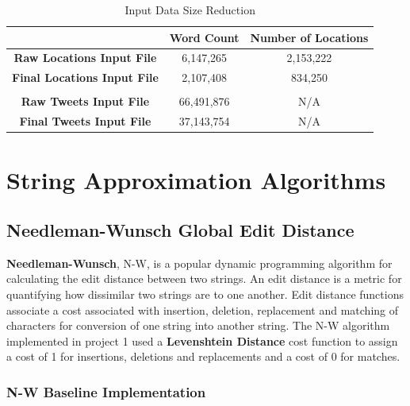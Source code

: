 \documentclass[11pt,a4paper]{article}
\begin{document}
\begin{table} [th]
\caption{Input Data Size Reduction}
\begin{center}
	\begin{tabular}{| c | c | c |}
	\hline
	 &  \textbf{Word Count} & \textbf{Number of Locations}\\
	\hline
	\textbf{Raw Locations Input File} & 6,147,265 & 2,153,222\\
	\hline
	\textbf{Final Locations Input File} & 2,107,408 & 834,250\\
	\hline
	 &  & \\
	\hline
	\textbf{Raw Tweets Input File} & 66,491,876 & N/A\\
	\hline
	\textbf{Final Tweets Input File} & 37,143,754 & N/A\\
	\hline
	\end{tabular}
\end{center}
\label{table:input-table}
\end{table}

\section{String Approximation Algorithms}

\subsection{Needleman-Wunsch Global Edit Distance}

\textbf{Needleman-Wunsch}, N-W, is a popular dynamic programming algorithm for calculating the edit distance between two strings. An edit distance is a metric for quantifying how dissimilar two strings are to one another. Edit distance functions associate a cost associated with insertion, deletion, replacement and matching of characters for conversion of one string into another string. The N-W algorithm implemented in project 1 used a \textbf{Levenshtein Distance} cost function to assign a cost of 1 for insertions, deletions and replacements and a cost of 0 for matches.

\subsubsection{N-W Baseline Implementation}
\end{document}

